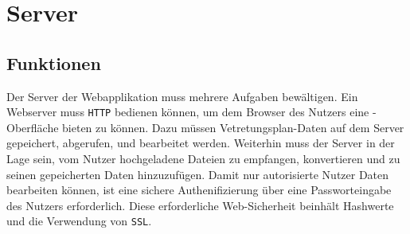 \section{Server}
\subsection{Funktionen}
Der Server der Webapplikation muss
mehrere Aufgaben bewältigen. Ein Webserver muss \texttt{HTTP} bedienen können, um
dem Browser des Nutzers eine \HTML-Oberfläche bieten zu können. Dazu müssen
Vetretungsplan-Daten auf dem Server gepeichert, abgerufen, und bearbeitet
werden. Weiterhin muss der Server in der Lage sein, vom Nutzer hochgeladene
Dateien zu empfangen, konvertieren und zu seinen gepeicherten Daten
hinzuzufügen. Damit nur autorisierte Nutzer Daten bearbeiten können, ist eine
sichere Authenifizierung über eine Passworteingabe des Nutzers erforderlich.
Diese erforderliche Web-Sicherheit beinhält Hashwerte und die Verwendung von
\texttt{SSL}.

